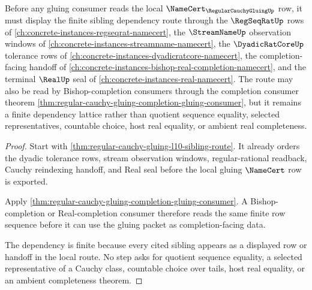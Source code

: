 \begin{theorem}
\label{thm:regular-cauchy-gluing-l10-sibling-dependency}
Before any gluing consumer reads the local $\NameCert_{\RegularCauchyGluingUp}$ row, it must display the finite sibling dependency route through the $\RegSeqRatUp$ rows of \autoref{ch:concrete-instances-regseqrat-namecert}, the $\StreamNameUp$ observation windows of \autoref{ch:concrete-instances-streamname-namecert}, the $\DyadicRatCoreUp$ tolerance rows of \autoref{ch:concrete-instances-dyadicratcore-namecert}, the completion-facing handoff of \autoref{ch:concrete-instances-bishop-real-completion-namecert}, and the terminal $\RealUp$ seal of \autoref{ch:concrete-instances-real-namecert}. The route may also be read by Bishop-completion consumers through the completion consumer theorem \autoref{thm:regular-cauchy-gluing-completion-gluing-consumer}, but it remains a finite dependency lattice rather than quotient sequence equality, selected representatives, countable choice, host real equality, or ambient real completeness.
\end{theorem}
\begin{proof}
Start with \autoref{thm:regular-cauchy-gluing-l10-sibling-route}. It already orders the dyadic tolerance rows, stream observation windows, regular-rational readback, Cauchy reindexing handoff, and Real seal before the local gluing $\NameCert$ row is exported.

Apply \autoref{thm:regular-cauchy-gluing-completion-gluing-consumer}. A Bishop-completion or Real-completion consumer therefore reads the same finite row sequence before it can use the gluing packet as completion-facing data.

The dependency is finite because every cited sibling appears as a displayed row or handoff in the local route. No step asks for quotient sequence equality, a selected representative of a Cauchy class, countable choice over tails, host real equality, or an ambient completeness theorem.
\end{proof}

